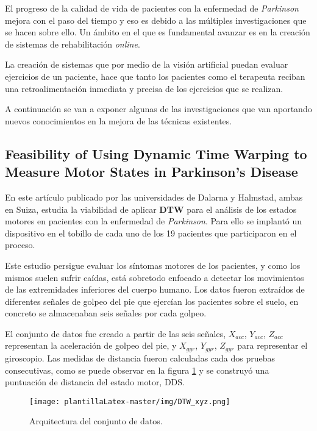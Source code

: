 \label{cap:TrabRel}
El progreso de la calidad de vida de pacientes con la enfermedad de \textit{Parkinson} mejora con el paso del tiempo y eso es debido a las múltiples investigaciones que se hacen sobre ello. Un ámbito en el que es fundamental avanzar es en la creación de sistemas de rehabilitación \textit{online}. 

La creación de sistemas que por medio de la visión artificial puedan evaluar ejercicios de un paciente, hace que tanto los pacientes como el terapeuta reciban una retroalimentación inmediata y precisa de los ejercicios que se realizan. 

A continuación se van a exponer algunas de las investigaciones que van aportando nuevos conocimientos en la mejora de las técnicas existentes. 

\subsection{Feasibility of Using Dynamic Time Warping to Measure Motor States in Parkinson’s Disease ~\cite{aghanavesi2020feasibility}} 

En este artículo publicado por las universidades de Dalarna y Halmstad, ambas en Suiza, estudia la viabilidad de aplicar \textbf{DTW} para el análisis de los estados motores en pacientes con la enfermedad de \textit{Parkinson}. Para ello se implantó un dispositivo en el tobillo de cada uno de los 19 pacientes que participaron en el proceso.

Este estudio persigue evaluar los síntomas motores de los pacientes, y como los mismos suelen sufrir caídas, está sobretodo enfocado a detectar los movimientos de las extremidades inferiores del cuerpo humano. Los datos fueron extraídos de diferentes señales de golpeo del pie que ejercían los pacientes sobre el suelo, en concreto se almacenaban seis señales por cada golpeo. 

El conjunto de datos fue creado a partir de las seis señales, $X_{acc}$, $Y_{acc}$, $Z_{acc}$ representan la aceleración de golpeo del pie, y $X_{gyr}$, $Y_{gyr}$, $Z_{gyr}$ para representar el giroscopio. Las medidas de distancia fueron calculadas cada dos pruebas consecutivas, como se puede observar en la figura \ref{f:datosdds} y se construyó una puntuación de distancia del estado motor, DDS.

\begin{figure}
 \centering
    \texttt{[image: plantillaLatex-master/img/DTW\_xyz.png]}
    \caption{Arquitectura del conjunto de datos.}
    \label{f:datosdds}
\end{figure}


